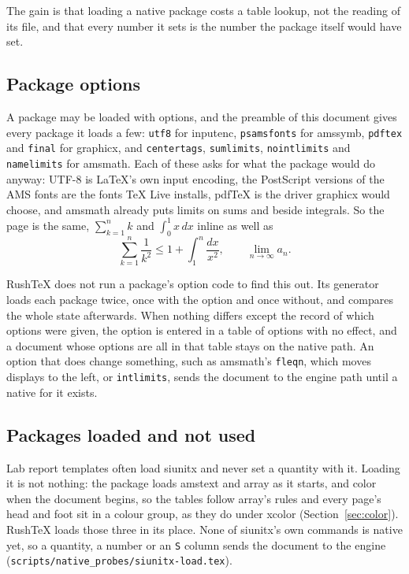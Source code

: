 \documentclass{article}
\numberwithin{equation}{section}
\theoremstyle{definition}
\theoremstyle{remark}
\begin{document}
The gain is that loading a native package costs a table lookup, not the reading of its
file, and that every number it sets is the number the package itself would have set.

\subsection{Package options}\label{sec:options}

A package may be loaded with options, and the preamble of this document gives every
package it loads a few: \texttt{utf8} for inputenc, \texttt{psamsfonts} for amssymb,
\texttt{pdftex} and \texttt{final} for graphicx, and \texttt{centertags},
\texttt{sumlimits}, \texttt{nointlimits} and \texttt{namelimits} for amsmath. Each of
these asks for what the package would do anyway: UTF-8 is \LaTeX's own input encoding,
the PostScript versions of the AMS fonts are the fonts \TeX{} Live installs, pdfTeX is
the driver graphicx would choose, and amsmath already puts limits on sums and beside
integrals. So the page is the same, $\sum_{k=1}^{n} k$ and $\int_0^1 x\,dx$ inline as
well as
\[
  \sum_{k=1}^{n} \frac{1}{k^{2}} \le 1 + \int_{1}^{n} \frac{dx}{x^{2}} , \qquad
  \lim_{n \to \infty} a_n .
\]

RushTeX does not run a package's option code to find this out. Its generator loads each
package twice, once with the option and once without, and compares the whole state
afterwards. When nothing differs except the record of which options were given, the
option is entered in a table of options with no effect, and a document whose options
are all in that table stays on the native path. An option that does change something,
such as amsmath's \texttt{fleqn}, which moves displays to the left, or
\texttt{intlimits}, sends the document to the engine path until a native for it exists.

\subsection{Packages loaded and not used}\label{sec:siunitx}

Lab report templates often load siunitx and never set a quantity with it. Loading it is
not nothing: the package loads amstext and array as it starts, and color when the document
begins, so the tables follow array's rules and every page's head and foot sit in a colour
group, as they do under xcolor (Section~\ref{sec:color}). RushTeX loads those three in
its place.
None of siunitx's own commands is native yet, so a quantity, a number or an \texttt{S}
column sends the document to the engine
(\texttt{scripts/native\_probes/siunitx-load.tex}).
\end{document}
